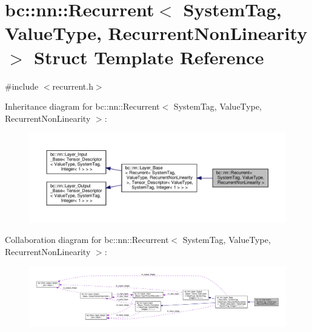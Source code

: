 \hypertarget{structbc_1_1nn_1_1Recurrent}{}\section{bc\+:\+:nn\+:\+:Recurrent$<$ System\+Tag, Value\+Type, Recurrent\+Non\+Linearity $>$ Struct Template Reference}
\label{structbc_1_1nn_1_1Recurrent}


{\ttfamily \#include $<$recurrent.\+h$>$}



Inheritance diagram for bc\+:\+:nn\+:\+:Recurrent$<$ System\+Tag, Value\+Type, Recurrent\+Non\+Linearity $>$\+:\nopagebreak
\begin{figure}[H]
\begin{center}
\leavevmode
\includegraphics[width=350pt]{structbc_1_1nn_1_1Recurrent__inherit__graph}
\end{center}
\end{figure}


Collaboration diagram for bc\+:\+:nn\+:\+:Recurrent$<$ System\+Tag, Value\+Type, Recurrent\+Non\+Linearity $>$\+:\nopagebreak
\begin{figure}[H]
\begin{center}
\leavevmode
\includegraphics[width=350pt]{structbc_1_1nn_1_1Recurrent__coll__graph}
\end{center}
\end{figure}
